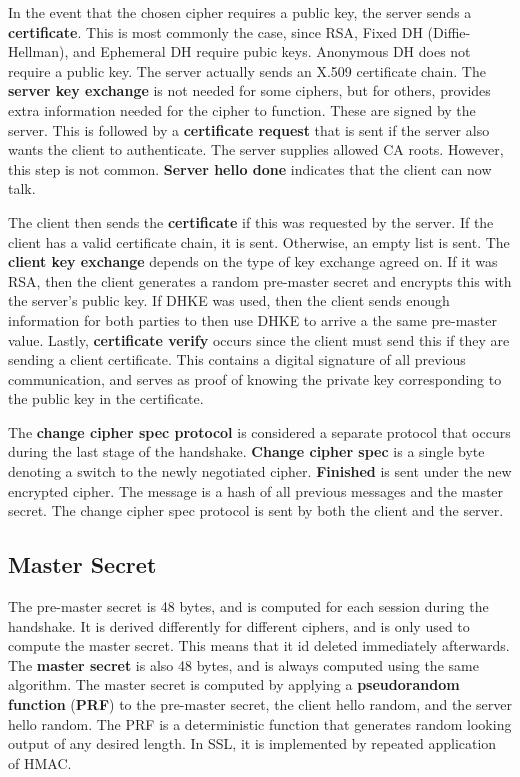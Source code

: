 \documentclass[11pt]{article}
\theoremstyle{plain} %
\theoremstyle{definition}
\theoremstyle{example}
\theoremstyle{remark}
\begin{document}
In the event that the chosen cipher requires a public key, the server sends a \textbf{certificate}. This is most commonly the case, since RSA, Fixed DH (Diffie-Hellman), and Ephemeral DH require pubic keys. Anonymous DH does not require a public key. The server actually sends an X.509 certificate chain. The \textbf{server key exchange} is not needed for some ciphers, but for others, provides extra information needed for the cipher to function. These are signed by the server. This is followed by a \textbf{certificate request} that is sent if the server also wants the client to authenticate. The server supplies allowed CA roots. However, this step is not common. \textbf{Server hello done} indicates that the client can now talk. 

The client then sends the \textbf{certificate} if this was requested by the server. If the client has a valid certificate chain, it is sent. Otherwise, an empty list is sent. The \textbf{client key exchange} depends on the type of key exchange agreed on. If it was RSA, then the client generates a random pre-master secret and encrypts this with the server's public key. If DHKE was used, then the client sends enough information for both parties to then use DHKE to arrive a the same pre-master value. Lastly, \textbf{certificate verify} occurs since the client must send this if they are sending a client certificate. This contains a digital signature of all previous communication, and serves as proof of knowing the private key corresponding to the public key in the certificate. 

The \textbf{change cipher spec protocol} is considered a separate protocol that occurs during the last stage of the handshake. \textbf{Change cipher spec} is a single byte denoting a switch to the newly negotiated cipher. \textbf{Finished} is sent under the new encrypted cipher. The message is a hash of all previous messages and the master secret. The change cipher spec protocol is sent by both the client and the server. 

\subsection{Master Secret}
The pre-master secret is 48 bytes, and is computed for each session during the handshake. It is derived differently for different ciphers, and is only used to compute the master secret. This means that it id deleted immediately afterwards. The \textbf{master secret} is also 48 bytes, and is always computed using the same algorithm. The master secret is computed by applying a \textbf{pseudorandom function} (\textbf{PRF}) to the pre-master secret, the client hello random, and the server hello random. The PRF is a deterministic function that generates random looking output of any desired length. In SSL, it is implemented by repeated application of HMAC. 
\end{document}

